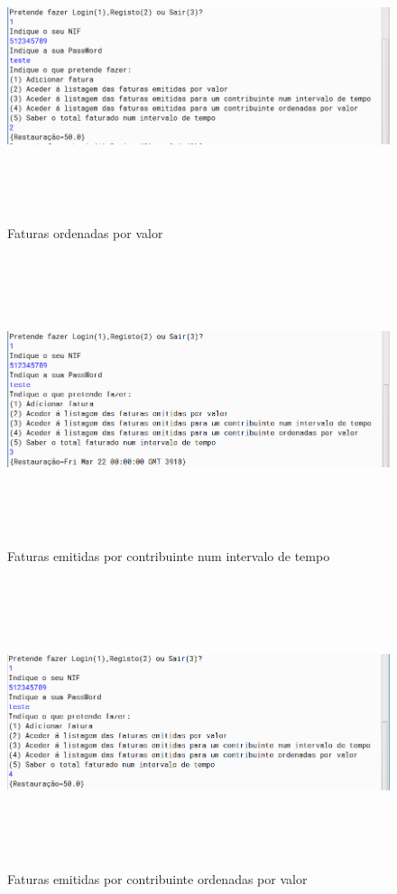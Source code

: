 \documentclass[a4paper]{article}
\begin{document}
			\begin{figure}[H]
				\centering
				\includegraphics[width = 320pt,height = 240pt]{faturasporvalorEmpresa.png}
				\caption{Faturas ordenadas por valor}
			\end{figure}
				
			\begin{figure}[H]
				\centering
				\includegraphics[width = 320pt,height = 240pt]{faturasemitidasporcontibuinte.png}
				\caption{Faturas emitidas por contribuinte num intervalo de tempo}
			\end{figure}
				
			\begin{figure}[H]
				\centering
				\includegraphics[width = 320pt,height = 240pt]{faturasordenadasporvalor.png}
				\caption{Faturas emitidas por contribuinte ordenadas por valor}
			\end{figure}
				
\end{document}
